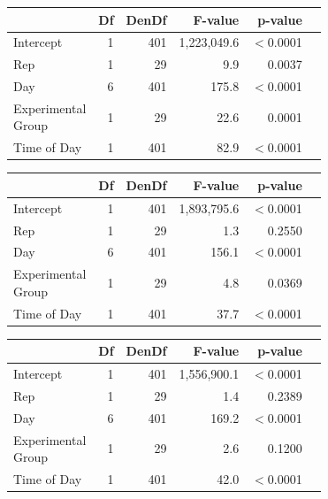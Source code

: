 \documentclass[a4paper, 10pt, titlepage]{article}
\begin{document}
\begin{table}[!htb]
\centering
{} 
\begin{tabular}{lrrrrr}
  \hline
 & Df & DenDf & F-value & p-value \\ 
  \hline
  Intercept & 1 & 401 & 1,223,049.6 & $<$0.0001\\
  Rep & 1 & 29 & 9.9 & 0.0037\\ 
  Day & 6 & 401 & 175.8 & $<$0.0001\\
  \makecell{Experimental \\ Group} & 1 & 29 & 22.6 & 0.0001\\
  Time of Day & 1 & 401 & 82.9 & $<$0.0001\\
   \hline
\end{tabular}
\end{table}

\begin{table}[!htb]
\centering
{} 
\begin{tabular}{lrrrrr}
  \hline
 & Df & DenDf & F-value & p-value \\ 
  \hline
  Intercept & 1 & 401 & 1,893,795.6 & $<$0.0001\\
  Rep & 1 & 29 & 1.3 & 0.2550\\ 
  Day & 6 & 401 & 156.1 & $<$0.0001\\
  \makecell{Experimental \\ Group} & 1 & 29 & 4.8 & 0.0369\\
  Time of Day & 1 & 401 & 37.7 & $<$0.0001\\
   \hline
\end{tabular}
\end{table}

\begin{table}[!htb]
\centering
{} 
\begin{tabular}{lrrrrr}
  \hline
 & Df & DenDf & F-value & p-value \\ 
  \hline
  Intercept & 1 & 401 & 1,556,900.1 & $<$0.0001\\
  Rep & 1 & 29 & 1.4 & 0.2389\\ 
  Day & 6 & 401 & 169.2 & $<$0.0001\\
  \makecell{Experimental \\ Group} & 1 & 29 & 2.6 & 0.1200\\
  Time of Day & 1 & 401 & 42.0 & $<$0.0001\\
   \hline
\end{tabular}
\end{table}
\end{document}
